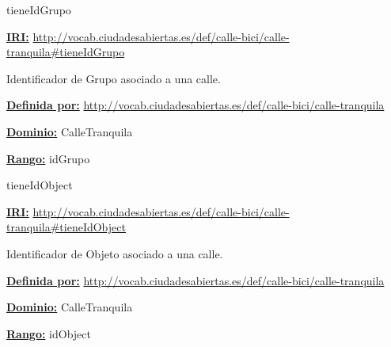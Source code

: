 \begin{mybox}{tieneIdGrupo}
\begin{flushleft}
\underline{\textbf{IRI:}}
\url{http://vocab.ciudadesabiertas.es/def/calle-bici/calle-tranquila#tieneIdGrupo}
\newline

Identificador de Grupo asociado a una calle.
\newline

\underline{\textbf{Definida por:}}
\url{http://vocab.ciudadesabiertas.es/def/calle-bici/calle-tranquila}
\newline

\underline{\textbf{Dominio:}}
		CalleTranquila
\newline

\underline{\textbf{Rango:}}
		idGrupo

\end{flushleft}
\end{mybox}




\begin{mybox}{tieneIdObject}
\begin{flushleft}
\underline{\textbf{IRI:}}
\url{http://vocab.ciudadesabiertas.es/def/calle-bici/calle-tranquila#tieneIdObject}
\newline

Identificador de Objeto asociado a una calle.
\newline

\underline{\textbf{Definida por:}}
\url{http://vocab.ciudadesabiertas.es/def/calle-bici/calle-tranquila}
\newline

\underline{\textbf{Dominio:}}
		CalleTranquila
\newline

\underline{\textbf{Rango:}}
		idObject

\end{flushleft}
\end{mybox}






